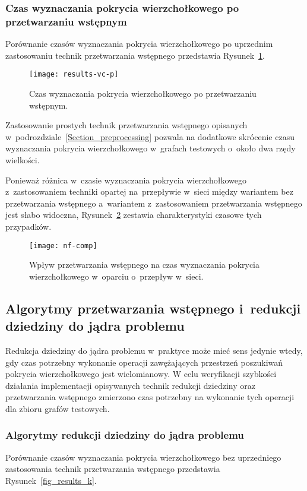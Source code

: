 \subsubsection{\textbf{Czas wyznaczania pokrycia wierzchołkowego po przetwarzaniu wstępnym}}

  Porównanie czasów wyznaczania pokrycia wierzchołkowego po uprzednim zastosowaniu technik przetwarzania wstępnego przedstawia Rysunek~\ref{fig_results_vc_p}.
  \begin{figure}
    \centering
      \texttt{[image: results-vc-p]}
      \caption{Czas wyznaczania pokrycia wierzchołkowego po przetwarzaniu wstępnym.}
    \label{fig_results_vc_p}
  \end{figure}
  Zastosowanie prostych technik przetwarzania wstępnego opisanych w~podrozdziale~\ref{Section_preprocessing} pozwala na dodatkowe skrócenie czasu wyznaczania pokrycia wierzchołkowego w~grafach testowych o~około dwa rzędy wielkości.

  Ponieważ różnica w~czasie wyznaczania pokrycia wierzchołkowego z~zastosowaniem techniki opartej na~przepływie w~sieci między wariantem bez przetwarzania wstępnego a~wariantem z~zastosowaniem przetwarzania wstępnego jest słabo widoczna, Rysunek~\ref{fig_nf_comp} zestawia charakterystyki czasowe tych przypadków.
  \begin{figure}
    \centering
      \texttt{[image: nf-comp]}
    \caption{Wpływ przetwarzania wstępnego na czas wyznaczania pokrycia wierzchołkowego w~oparciu o~przepływ w~sieci.}
    \label{fig_nf_comp}
  \end{figure}

\subsection{Algorytmy przetwarzania wstępnego i~redukcji dziedziny do jądra problemu}
  Redukcja dziedziny do jądra problemu w~praktyce może mieć sens jedynie wtedy, gdy czas potrzebny wykonanie operacji zawężających przestrzeń poszukiwań pokrycia wierzchołkowego jest wielomianowy.
  W celu weryfikacji szybkości działania implementacji opisywanych technik redukcji dziedziny oraz przetwarzania wstępnego zmierzono czas potrzebny na wykonanie tych operacji dla zbioru grafów testowych. 

\subsubsection{\textbf{Algorytmy redukcji dziedziny do jądra problemu}}
  Porównanie czasów wyznaczania pokrycia wierzchołkowego bez uprzedniego zastosowania technik przetwarzania wstępnego przedstawia Rysunek~\ref{fig_results_k}.

